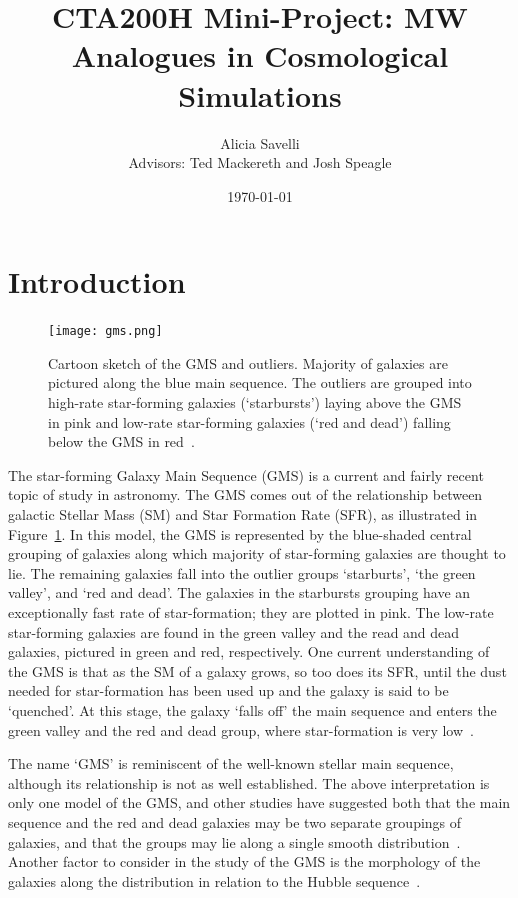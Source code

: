 \documentclass[12pt]{article}
\title{CTA200H Mini-Project: MW Analogues in Cosmological Simulations}
\author{Alicia Savelli\\Advisors: Ted Mackereth and Josh Speagle}
\date{\today}
\begin{document}
\maketitle


\section{Introduction}
\begin{figure}
    \centering
    \texttt{[image: gms.png]}
    \caption{Cartoon sketch of the GMS and outliers.  Majority of galaxies are pictured along the blue main sequence.  The outliers are grouped into high-rate star-forming galaxies (`starbursts') laying above the GMS in pink and low-rate star-forming galaxies (`red and dead') falling below the GMS in red~\cite{Alton2016}.}
    \label{fig:gms}
\end{figure}

The star-forming Galaxy Main Sequence (GMS) is a current and fairly recent topic of study in astronomy.  The GMS comes out of the relationship between galactic Stellar Mass (SM) and Star Formation Rate (SFR), as illustrated in Figure~\ref{fig:gms}.  In this model, the GMS is represented by the blue-shaded central grouping of galaxies along which majority of star-forming galaxies are thought to lie.  The remaining galaxies fall into the outlier groups `starburts', `the green valley', and `red and dead'.  The galaxies in the starbursts grouping have an exceptionally fast rate of star-formation; they are plotted in pink.  The low-rate star-forming galaxies are found in the green valley and the read and dead galaxies, pictured in green and red, respectively.  One current understanding of the GMS is that as the SM of a galaxy grows, so too does its SFR, until the dust needed for star-formation has been used up and the galaxy is said to be `quenched'.  At this stage, the galaxy `falls off' the main sequence and enters the green valley and the red and dead group, where star-formation is very low~\cite{Alton2016}.


The name `GMS' is reminiscent of the well-known stellar main sequence, although its relationship is not as well established.  The above interpretation is only one model of the GMS, and other studies have suggested both that the main sequence and the red and dead galaxies may be two separate groupings of galaxies, and that the groups may lie along a single smooth distribution~\cite{Eales_2016}.  Another factor to consider in the study of the GMS is the morphology of the galaxies along the distribution in relation to the Hubble sequence~\cite{Eales_2016}.   
\end{document}
